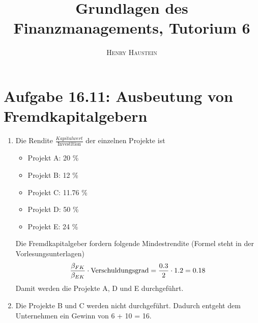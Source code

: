 \documentclass{article}
\title{\textbf{Grundlagen des Finanzmanagements, Tutorium 6}}
\author{\textsc{Henry Haustein}}
\date{}
\begin{document}
	\maketitle
	
	\section*{Aufgabe 16.11: Ausbeutung von Fremdkapitalgebern}
	\begin{enumerate}[label=(\alph*)]
		\item Die Rendite $\frac{Kapitalwert}{\text{Investition}}$ der einzelnen Projekte ist
		\begin{itemize}
			\item Projekt A: 20 \%
			\item Projekt B: 12 \%
			\item Projekt C: 11.76 \%
			\item Projekt D: 50 \%
			\item Projekt E: 24 \%
		\end{itemize}
		Die Fremdkapitalgeber fordern folgende Mindestrendite (Formel steht in der Vorlesungsunterlagen)
		\begin{align}
			\frac{\beta_{FK}}{\beta_{EK}} \cdot \text{Verschuldungsgrad} = \frac{0.3}{2}\cdot 1.2 = 0.18 \notag
		\end{align}
		Damit werden die Projekte A, D und E durchgeführt.
		\item Die Projekte B und C werden nicht durchgeführt. Dadurch entgeht dem Unternehmen ein Gewinn von 6 + 10 = 16.
	\end{enumerate}
	
\end{document}
